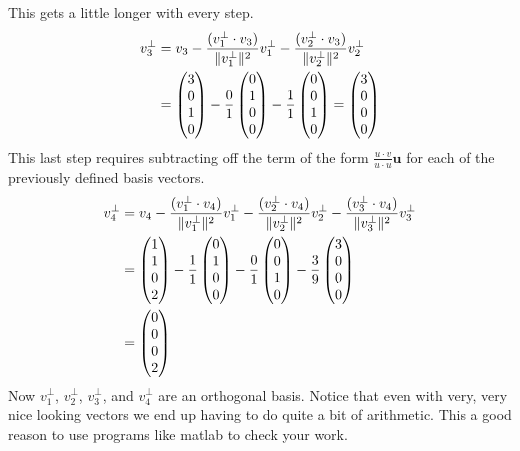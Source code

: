 {This gets a little longer with every step.
\begin{align*}
v_3^\bot &= v_3  -\frac{(v_1^\bot \cdot v_3 )}{\|v_1^\bot\|^2} v_1^\bot  -\frac{(v_2^\bot \cdot v_3 )}{\|v_2^\bot\|^2} v_2^\bot\\
&=\begin{pmatrix} 3\\0 \\ 1\\ 0 \end{pmatrix}- \frac{0}{1} \begin{pmatrix} 0\\1 \\ 0\\ 0 \end{pmatrix} - \frac{1}{1}  \begin{pmatrix} 0\\0\\ 1\\ 0 \end{pmatrix}  = \begin{pmatrix} 3\\0 \\ 0\\ 0 \end{pmatrix}
\end{align*}
This last step requires subtracting off the term of the form $\frac{u\cdot v}{u \cdot u} \mathbf{u}$ for each of the previously defined basis vectors.
\begin{align*}
v_4^\bot &= v_4  - \frac{(v_1^\bot \cdot v_4 )}{\|v_1^\bot\|^2} v_1^\bot  -\frac{(v_2^\bot \cdot v_4 )}{\|v_2^\bot\|^2} v_2^\bot  -\frac{(v_3^\bot \cdot v_4 )}{\|v_3^\bot\|^2} v_3^\bot \\
&= \begin{pmatrix} 1\\ 1\\ 0\\2 \end{pmatrix}  -\frac{1}{1}  \begin{pmatrix} 0\\1 \\ 0\\ 0 \end{pmatrix}  - \frac{0}{1} \begin{pmatrix} 0\\0\\ 1\\ 0 \end{pmatrix}  -\frac{3}{9}  \begin{pmatrix} 3\\0 \\ 0\\ 0 \end{pmatrix} \\
&= \begin{pmatrix} 0\\ 0\\ 0\\2 \end{pmatrix}
\end{align*}
Now $v_1^\bot$,  $v_2^\bot$, $v_3^\bot$, and $v_4^\bot$ are an orthogonal basis. Notice that even with very, very nice looking vectors we end up having to do quite a bit of arithmetic. This a good reason to use programs like matlab to check your work.
}

